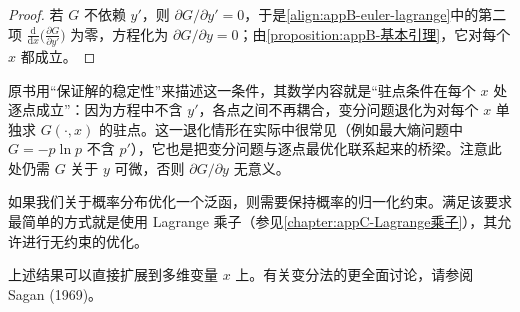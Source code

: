 \documentclass[../main.tex]{subfiles}
\begin{document}
\begin{proof}
若 $G$ 不依赖 $y'$，则 $\partial G/\partial y'=0$，于是\eqref{align:appB-euler-lagrange}中的第二项 $\frac{\mathrm{d}}{\mathrm{d}x}\bigl(\frac{\partial G}{\partial y'}\bigr)$ 为零，方程化为 $\partial G/\partial y=0$；由\cref{proposition:appB-基本引理}，它对每个 $x$ 都成立。
\end{proof}

\begin{remark}
原书用“保证解的稳定性”来描述这一条件，其数学内容就是“驻点条件在每个 $x$ 处逐点成立”：因为方程中不含 $y'$，各点之间不再耦合，变分问题退化为对每个 $x$ 单独求 $G(\cdot,x)$ 的驻点。这一退化情形在实际中很常见（例如最大熵问题中 $G=-p\ln p$ 不含 $p'$），它也是把变分问题与逐点最优化联系起来的桥梁。注意此处仍需 $G$ 关于 $y$ 可微，否则 $\partial G/\partial y$ 无意义。
\end{remark}

如果我们关于概率分布优化一个泛函，则需要保持概率的归一化约束。满足该要求最简单的方式就是使用 Lagrange 乘子（参见\cref{chapter:appC-Lagrange乘子}），其允许进行无约束的优化。

上述结果可以直接扩展到多维变量 $x$ 上。有关变分法的更全面讨论，请参阅 Sagan (1969)。
\end{document}
